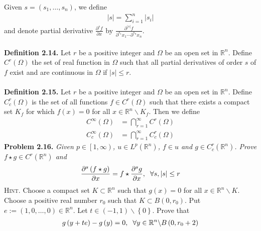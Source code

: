 \documentclass[a4paper]{article}
\numberwithin{equation}{section}
\begin{document}
Given $s = \left( {{s_1}, \ldots ,{s_n}} \right)$, we define
\begin{align}
\left| s \right| = \sum\limits_{i = 1}^n {\left| {{s_i}} \right|} 
\end{align}
and denote partial derivative $\frac{{{\partial ^s}f}}{{\partial x}}$ by $\frac{{{\partial ^{\left| s \right|}}f}}{{{\partial ^{{s_1}}}{x_1} \cdots {\partial ^{{s_n}}}{x_n}}}$. \\
\\
\textbf{Definition 2.14.} Let $r$ be a positive integer and $\Omega$ be an open set in $\mathbb{R}^n$. Define $C^r\left(\Omega\right)$ the set of real function in $\Omega$ such that all partial derivatives of order $s$ of $f$ exist and are continuous in $\Omega$ if $\left| s \right| \le r$.\\
\\
\textbf{Definition 2.15.} Let $r$ be a positive integer and $\Omega$ be an open set in $\mathbb{R}^n$. Define $C_c^r\left( \Omega  \right)$ is the set of all functions $f \in C^r\left(\Omega\right)$ such that there exists a compact set $K_f$ for which $f\left(x\right)=0$ for all $x \in {\mathbb{R}^n}\backslash {K_f}$. Then we define
\begin{align}
{C^\infty }\left( \Omega  \right) &= \bigcap\limits_{r = 1}^\infty  {{C^r}\left( \Omega  \right)} \\
C_c^\infty \left( \Omega  \right) &= \bigcap\limits_{r = 1}^\infty  {C_c^r\left( \Omega  \right)} 
\end{align}
\textbf{Problem 2.16.} \textit{Given $p \in \left[1,\infty\right)$, $u\in L^p\left(\mathbb{R}^n\right)$, $f\in u$ and $g\in C_c^r\left(\mathbb{R}^n\right)$. Prove $f\star g \in C^r\left(\mathbb{R}^n\right)$ and}
\begin{align}
\frac{{{\partial ^s}\left( {f\star g} \right)}}{{\partial x}} = f\star \frac{{{\partial ^s}g}}{{\partial x}},\hspace{0.2cm}\forall s,\left| s \right| \le r
\end{align}
\textsc{Hint.} Choose a compact set $K \subset \mathbb{R}^n$ such that $g\left(x\right)=0$ for all $x\in \mathbb{R}^n\backslash K$. Choose a positive real number $r_0$ such that $K\subset B\left(0,r_0\right)$. Put $e:=\left(1,0,\ldots,0\right)\in \mathbb{R}^n$. Let $t \in \left( { - 1,1} \right)\backslash \left\{ 0 \right\}$. Prove that
\begin{align}
g\left( {y + te} \right) - g\left( y \right) = 0,\hspace{0.2cm}\forall y \in {\mathbb{R}^n}\backslash B\left( {0,{r_0} + 2} \right)
\end{align}
\end{document}
